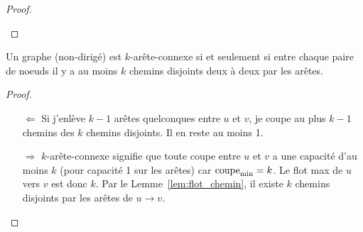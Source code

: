 \begin{mylem}
\begin{proof}
    \begin{figure}[h!]
      \centering
    \end{figure}
  \end{proof}
\end{mylem}

\begin{mytheo}
  \label{theo:kconnexe_chemin}
  Un graphe (non-dirigé) est $k$-arête-connexe si et seulement si entre chaque paire de noeuds il y a au moins $k$ chemins disjoints deux à deux par les arêtes.
  \begin{proof}
    \begin{itemize}
      \item[$\Leftarrow$]
        Si j'enlève $k-1$ arêtes quelconques
        entre $u$ et $v$, je coupe au plus $k-1$
        chemins des $k$ chemins disjoints.
        Il en reste au moins 1.
      \item[$\Rightarrow$]
        $k$-arête-connexe signifie que toute coupe entre $u$
        et $v$ a une capacité d'au moins $k$ (pour capacité 1
        sur les arêtes) car $\operatorname{\mathrm{coupe}_\mathrm{min}} = k$.
        Le flot max de $u$ vers $v$ est donc $k$.
        Par le Lemme~\ref{lem:flot_chemin},
        il existe $k$ chemins disjoints par les arêtes de
        $u \to v$.
    \end{itemize}
  \end{proof}
\end{mytheo}


